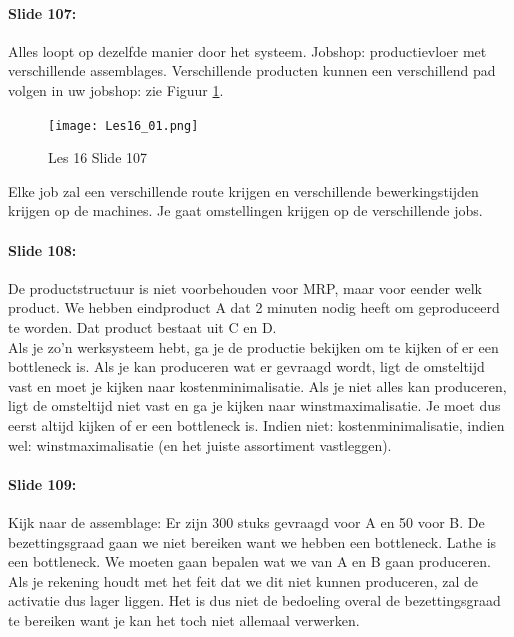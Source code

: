 \documentclass[10pt,a4paper]{report}
\begin{document}
\paragraph{Slide 107:} Alles loopt op dezelfde manier door het systeem. Jobshop: productievloer met verschillende assemblages. Verschillende producten kunnen een verschillend pad volgen in uw jobshop: zie Figuur \ref{les16_01}.\\

\begin{figure}[h!]
\centering
\texttt{[image: Les16\_01.png]}
\caption{Les 16 Slide 107} 
\label{les16_01}
\end{figure}

Elke job zal een verschillende route krijgen en verschillende bewerkingstijden krijgen op de machines. Je gaat omstellingen krijgen op de verschillende jobs. 

\paragraph{Slide 108:} De productstructuur is niet voorbehouden voor MRP, maar voor eender welk product.%
We hebben eindproduct A dat 2 minuten nodig heeft om geproduceerd te worden. Dat product bestaat uit C en D. \\
Als je zo'n werksysteem hebt, ga je de productie bekijken om te kijken of er een bottleneck is. Als je kan produceren wat er gevraagd wordt, ligt de omsteltijd vast en moet je kijken naar kostenminimalisatie. Als je niet alles kan produceren, ligt de omsteltijd niet vast en ga je kijken naar winstmaximalisatie. Je moet dus eerst altijd kijken of er een bottleneck is. Indien niet: kostenminimalisatie, indien wel: winstmaximalisatie (en het juiste assortiment vastleggen).

\paragraph{Slide 109:} Kijk naar de assemblage: Er zijn 300 stuks gevraagd voor A en 50 voor B. De bezettingsgraad gaan we niet bereiken want we hebben een bottleneck. Lathe is een bottleneck. We moeten gaan bepalen wat we van A en B gaan produceren.\\
Als je rekening houdt met het feit dat we dit niet kunnen produceren, zal de activatie dus lager liggen. Het is dus niet de bedoeling overal de bezettingsgraad te bereiken want je kan het toch niet allemaal verwerken. 
\end{document}
